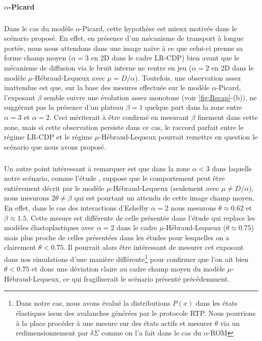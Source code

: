 \paragraph{$\alpha$-Picard}

\subparagraph{}Dans le cas du modèle $\alpha$-Picard, cette hypothèse est mieux motivée dans le scénario proposé. En effet, en présence d'un mécanisme de transport à longue portée, nous nous attendons dans une image naïve à ce que celui-ci prenne sa forme champ moyen ($\alpha = 3$ en 2D dans le cadre LR-CDP) bien avant que le mécanisme de diffusion via le bruit interne ne rentre en jeu ($\alpha = 2$ en 2D dans le modèle $\mu$-Hébraud-Lequeux avec $\mu = D / \alpha$). Toutefois, une observation assez inattendue est que, sur la base des mesures effectuée sur le modèle $\alpha$-Picard, l'exposant $\beta$ semble suivre une évolution assez monotone (voir \autoref{fig:Recap}-(b)), ne suggérant pas la présence d'un plateau $\beta = 1$ quelque part dans la zone entre $\alpha = 3$ et $\alpha = 2$. Ceci mériterait à être confirmé en mesurant $\beta$ finement dans cette zone, mais si cette observation persiste dans ce cas, le raccord parfait entre le régime LR-CDP et le régime $\mu$-Hébraud-Lequeux pourrait remettre en question le scénario que nous avons proposé.

\subparagraph{}Un autre point intéressant à remarquer est que dans la zone $\alpha < 3$ dans laquelle notre scénario, comme l'étude \cite{ferrero_criticality_2019}, suppose que le comportement peut être entièrement décrit par le modèle $\mu$-Hébraud-Lequeux (seulement avec $\mu \neq D/\alpha$), nous mesurons $2\theta \neq \beta$ qui est pourtant un attendu de cette image champ moyen. En effet, dans le cas des interactions d'Eshelby $\alpha = 2$ nous mesurons $\theta \approx 0.62$ et $\beta \approx 1.5$. Cette mesure est différente de celle présentée dans l'étude \cite{ferrero_criticality_2019} qui replace les modèles élastoplastiques avec $\alpha = 2$ dans le cadre $\mu$-Hébraud-Lequeux ($\theta \approx 0.75$) mais plus proche de celles présentées dans les études \cite{lin_scaling_2014, liu_driving_2016, lin_mean-field_2016} pour lesquelles on a clairement $\theta < 0.75$. Il pourrait alors être intéressant de mesurer cet exposant dans nos simulations d'une manière différente\footnote{Dans notre cas, nous avons évalué la distributions $P(x)$ dans les états élastiques issus des avalanches générées par le protocole RTP. Nous pourrions à la place procéder à une mesure sur des états actifs et mesurer $\theta$ via un redimensionnement par $\delta\Sigma$ comme on l'a fait dans le cas du $\alpha$-ROM} pour confirmer que l'on ait bien $\theta < 0.75$ et donc une déviation claire au cadre champ moyen du modèle $\mu$-Hébraud-Lequeux, ce qui fragiliserait le scénario présenté précédemment.

